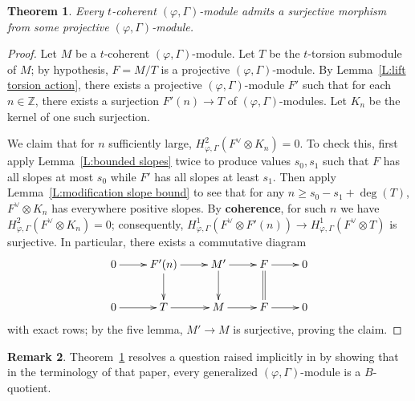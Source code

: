 \documentclass[12pt]{amsart}
\newtheorem{theorem}{Theorem}[section]
\theoremstyle{definition}
\newtheorem{remark}[theorem]{Remark}
\numberwithin{equation}{theorem}
\newcommand{\ZZ}{\mathbb{Z}}
\newcommand{\dual}{\vee}
\begin{document}
\begin{theorem} \label{T:t-coherent lift}
Every $t$-coherent $(\varphi, \Gamma)$-module admits a surjective morphism from some projective $(\varphi, \Gamma)$-module.
\end{theorem}
\begin{proof}
Let $M$ be a $t$-coherent $(\varphi, \Gamma)$-module. Let $T$ be the $t$-torsion submodule of $M$; by hypothesis, $F = M/T$ is a projective $(\varphi, \Gamma)$-module.
By Lemma~\ref{L:lift torsion action}, there exists a projective $(\varphi, \Gamma)$-module $F'$ such that  for each $n \in \ZZ$, there exists a surjection $F'(n) \to T$ of $(\varphi, \Gamma)$-modules. Let $K_n$ be the kernel of one such surjection. 

We claim that for $n$ sufficiently large, $H^2_{\varphi, \Gamma}(F^\dual \otimes K_n) = 0$.
To check this, first apply Lemma~\ref{L:bounded slopes} twice to produce values $s_0, s_1$ such that $F$ has all slopes at most $s_0$ while $F'$ has all slopes at least $s_1$.
Then apply Lemma~\ref{L:modification slope bound} to see that for any
$n \geq s_0-s_1 + \deg(T)$,
$F^\dual \otimes K_n$ has everywhere positive slopes. 
By \textbf{coherence}, for such $n$ we have $H^2_{\varphi, \Gamma}(F^\dual \otimes K_n) = 0$; consequently, $H^1_{\varphi, \Gamma}(F^\dual \otimes F'(n)) \to H^1_{\varphi, \Gamma}(F^\dual \otimes T)$ is surjective. In particular, there exists a commutative diagram
\[
\xymatrix{
0 \ar[r] & F'(n) \ar[r] \ar[d] & M' \ar[r] \ar[d] & F \ar[r] \ar@{=}[d] & 0 \\
0 \ar[r] & T \ar[r] & M \ar[r] & F \ar[r] & 0
}
\]
with exact rows; by the five lemma, $M' \to M$ is surjective, proving the claim.
\end{proof}

\begin{remark}
Theorem~\ref{T:t-coherent lift} resolves a question raised implicitly in
\cite{kedlaya-bordeaux} by showing that in the terminology of that paper,
every generalized $(\varphi, \Gamma)$-module is a $B$-quotient.
\end{remark}
\end{document}
